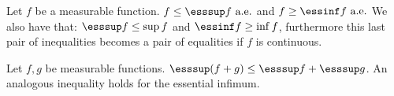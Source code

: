         \begin{property}
		Let $f$ be a measurable function. $f\leq\esssup f\text{ a.e.}$ and $f\geq\essinf f\text{ a.e.}$ We also have that: $\esssup f\leq\sup f$ and $\essinf f\geq\inf f$, furthermore this last pair of inequalities becomes a pair of equalities if $f$ is continuous.
	\end{property}
        \begin{property}
		Let $f,g$ be measurable functions. $\esssup(f+g)\leq\esssup f + \esssup g$. An analogous inequality holds for the essential infimum.
	\end{property}
